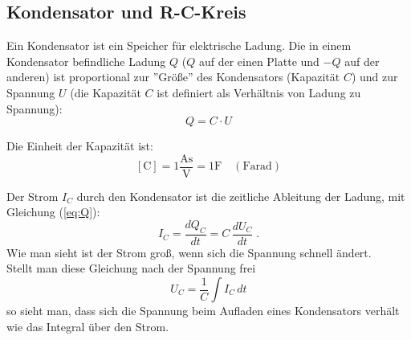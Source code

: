 \subsection{Kondensator und R-C-Kreis}

Ein Kondensator ist ein Speicher für elektrische Ladung. Die in einem Kondensator befindliche Ladung $Q$ ($Q$ auf der einen Platte und $-Q$ auf der anderen) ist proportional zur ''Größe'' des Kondensators (Kapazität $C$) und zur Spannung $U$ (die Kapazität $C$ ist definiert als Verhältnis von Ladung zu Spannung):
\begin{equation}
 Q = C\cdot U
 \label{eq:Q}
\end{equation}

\noindent
Die Einheit der Kapazität ist:
\begin{equation}
 \mathrm{\left[C\right] = 1\frac{As}{V} = 1 F \quad (Farad)}
\end{equation}

\noindent
Der Strom $I_C$ durch den Kondensator ist die zeitliche Ableitung der Ladung, mit Gleichung (\ref{eq:Q}):
\begin{equation}
 I_C = \frac{dQ_C}{dt} = C\,\frac{dU_C}{dt}\; .
 \label{eq:I_C}
\end{equation}
Wie man sieht ist der Strom groß, wenn sich die Spannung schnell ändert.\\
Stellt man diese Gleichung nach der Spannung frei
\begin{equation}
 U_C = \frac{1}{C}\int{I_C\, dt}
\end{equation}
so sieht man, dass sich die Spannung beim Aufladen eines Kondensators verhält wie das Integral über den Strom.

